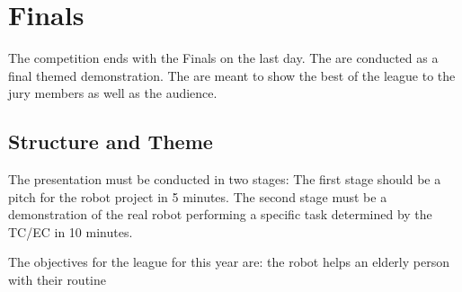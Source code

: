 \chapter{Finals}
\label{chap:finals}

The competition ends with the Finals on the last day.
The  are conducted as a final themed demonstration.
The  are meant to show the best of the league to the jury members as well as the audience.

\section{Structure and Theme}


The presentation must be conducted in two stages:
The first stage should be a pitch for the robot project in 5 minutes. 
The second stage must be a demonstration of the real robot performing a specific task determined by the TC/EC in 10 minutes.

The objectives for the league for this year are:
the robot helps an elderly person with their routine



